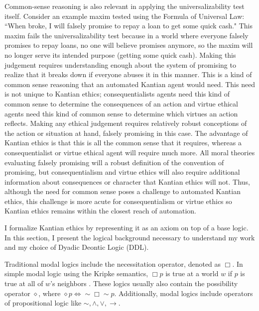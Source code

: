 \begin{isabellebody}
\begin{isamarkuptext}
Common-sense reasoning is also relevant in applying the universalizability test itself. Consider an example
maxim tested using the Formula of Universal Law: ``When broke, I will falsely promise to repay a loan
to get some quick cash." This maxim fails the universalizability test because in a world where everyone
falsely promises to repay loans, no one will believe promises anymore, so the maxim will no longer serve
its intended purpose (getting some quick cash). Making this judgement requires understanding enough about
the system of promising to realize that it breaks down if everyone abuses it in this manner. This is a
kind of common sense reasoning that an automated Kantian agent would need. This need is not unique to 
Kantian ethics; consequentialists agents need this kind of common sense to determine the consequences of 
an action and virtue ethical agents need this kind of common sense to determine which virtues an action
reflects. Making any ethical judgement requires relatively robust conceptions of the action or situation
at hand, falsely promising in this case. The advantage of Kantian ethics is that this is all the common 
sense that it requires, whereas a consequentialist or virtue ethical agent will require much more. All
moral theories evaluating falsely promising will a robust definition of the convention of promising, 
but consequentialism and virtue ethics will also require additional information about consequences or character
that Kantian ethics will not. Thus, although the need for common sense poses a challenge to automated
Kantian ethics, this challenge is more acute for consequentialism or virtue ethics so Kantian ethics remains
 within the closest reach of automation.%
\end{isamarkuptext}\isamarkuptrue%
%
\isadelimdocument
%
\endisadelimdocument
%
\isatagdocument
%
\isamarkuptrue%
%
\endisatagdocument
{\isafolddocument}%
%
\isadelimdocument
%
\endisadelimdocument
%
\begin{isamarkuptext}%
I formalize Kantian ethics by representing it as an axiom on top of a base logic. In this section, 
I present the logical background necessary to understand my work and my choice of Dyadic Deontic Logic (DDL).%
\end{isamarkuptext}\isamarkuptrue%
%
\begin{isamarkuptext}%
Traditional modal logics include the necessitation operator, denoted as $\Box$. In simple modal logic
using the Kripke semantics, $\Box p$ is true at a world $w$ if $p$ is true at all of $w$'s neighbors \cite{cresswell}. 
These logics usually also contain the possibility operator $\diamond$, where
 $\diamond p \iff \sim \Box \sim p$. Additionally, modal logics include operators of propositional 
logic like $\sim, \wedge, \vee, \rightarrow$.


\end{isamarkuptext}
\end{isabellebody}
